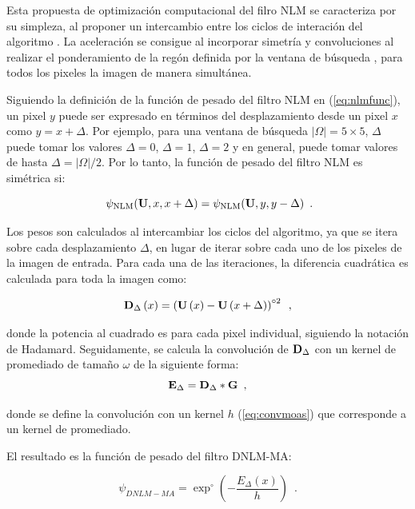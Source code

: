 Esta propuesta de optimización computacional del filro NLM se caracteriza por su simpleza, al proponer un intercambio entre los ciclos de interación del algoritmo \cite{Condat2010}. La aceleración se consigue al incorporar simetría y convoluciones al realizar el ponderamiento de la regón definida por la ventana de búsqueda \mat{\Omega}, para todos los pixeles la imagen de manera simultánea.

Siguiendo la definición de la función de pesado del filtro NLM en (\ref{eq:nlmfunc}), un pixel $y$ puede ser expresado en términos del desplazamiento desde un pixel $x$ como $y = x + \Delta$. Por ejemplo, para una ventana de búsqueda $\vert\Omega\vert = 5 \times 5$, $\Delta$ puede tomar los valores $\Delta=0$, $\Delta=1$, $\Delta=2$ y en general, puede tomar valores de hasta $\Delta=\vert\Omega\vert/2$. Por lo tanto, la función de pesado del filtro NLM es simétrica si:

\begin{equation}\
\psi_{\text{NLM}}(\mathbf{U}, x, x + \Delta) = \psi_{\text{NLM}}(\mathbf{U}, y, y - \Delta)  \enspace . 
\label{eq:symmetry}
\end{equation}

Los pesos son calculados al intercambiar los ciclos del algoritmo, ya que se itera sobre cada desplazamiento $\Delta$, en lugar de iterar sobre cada uno de los pixeles de la imagen de entrada. Para cada una de las iteraciones, la diferencia cuadrática es calculada para toda la imagen como:

\begin{equation}
\mathbf{D}_\Delta\left(x\right) = \left(\mathbf{U}\left(x\right) - \mathbf{U}\left( x + \Delta \right)\right)^{\circ2}  \enspace ,
\label{eq:diffquad}
\end{equation}

donde la potencia al cuadrado es para cada pixel individual, siguiendo la notación de Hadamard. Seguidamente, se calcula la convolución de
$\mathbf{D}_\Delta$ con un kernel de promediado de tama\~no $\omega$ de la siguiente forma:
\begin{equation}
\label{eq:convmoas}
\mathbf{E}_{\Delta} = \mathbf{D}_{\Delta} * \mathbf{G} \enspace ,
\end{equation}

donde se define la convolución con un kernel $h$ (\ref{eq:convmoas}) que corresponde a un kernel de promediado.


El resultado es la función de pesado del filtro DNLM-MA: 

\begin{equation}
\psi_{DNLM-MA}=\exp^{\circ}\left(-\frac{ E_\Delta\left(x\right) }{h}\right)  \enspace .
\label{eq:wmoas}
\end{equation}


